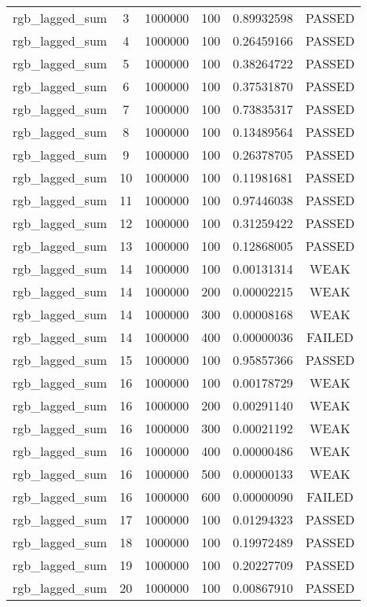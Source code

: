 \begin{longtable}{cccccc}
rgb\_lagged\_sum & 3 & 1000000 & 100 & 0.89932598 & PASSED \\
rgb\_lagged\_sum & 4 & 1000000 & 100 & 0.26459166 & PASSED \\
rgb\_lagged\_sum & 5 & 1000000 & 100 & 0.38264722 & PASSED \\
rgb\_lagged\_sum & 6 & 1000000 & 100 & 0.37531870 & PASSED \\
rgb\_lagged\_sum & 7 & 1000000 & 100 & 0.73835317 & PASSED \\
rgb\_lagged\_sum & 8 & 1000000 & 100 & 0.13489564 & PASSED \\
rgb\_lagged\_sum & 9 & 1000000 & 100 & 0.26378705 & PASSED \\
rgb\_lagged\_sum & 10 & 1000000 & 100 & 0.11981681 & PASSED \\
rgb\_lagged\_sum & 11 & 1000000 & 100 & 0.97446038 & PASSED \\
rgb\_lagged\_sum & 12 & 1000000 & 100 & 0.31259422 & PASSED \\
rgb\_lagged\_sum & 13 & 1000000 & 100 & 0.12868005 & PASSED \\
rgb\_lagged\_sum & 14 & 1000000 & 100 & 0.00131314 & WEAK \\
rgb\_lagged\_sum & 14 & 1000000 & 200 & 0.00002215 & WEAK \\
rgb\_lagged\_sum & 14 & 1000000 & 300 & 0.00008168 & WEAK \\
rgb\_lagged\_sum & 14 & 1000000 & 400 & 0.00000036 & FAILED \\
rgb\_lagged\_sum & 15 & 1000000 & 100 & 0.95857366 & PASSED \\
rgb\_lagged\_sum & 16 & 1000000 & 100 & 0.00178729 & WEAK \\
rgb\_lagged\_sum & 16 & 1000000 & 200 & 0.00291140 & WEAK \\
rgb\_lagged\_sum & 16 & 1000000 & 300 & 0.00021192 & WEAK \\
rgb\_lagged\_sum & 16 & 1000000 & 400 & 0.00000486 & WEAK \\
rgb\_lagged\_sum & 16 & 1000000 & 500 & 0.00000133 & WEAK \\
rgb\_lagged\_sum & 16 & 1000000 & 600 & 0.00000090 & FAILED \\
rgb\_lagged\_sum & 17 & 1000000 & 100 & 0.01294323 & PASSED \\
rgb\_lagged\_sum & 18 & 1000000 & 100 & 0.19972489 & PASSED \\
rgb\_lagged\_sum & 19 & 1000000 & 100 & 0.20227709 & PASSED \\
rgb\_lagged\_sum & 20 & 1000000 & 100 & 0.00867910 & PASSED \\

\end{longtable}
